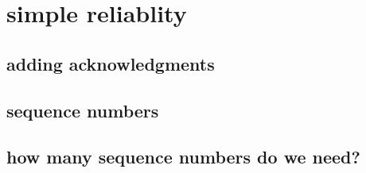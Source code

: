 
\section{simple reliablity}

\subsection{adding acknowledgments}


\subsection{sequence numbers}


\subsection{how many sequence numbers do we need?}

